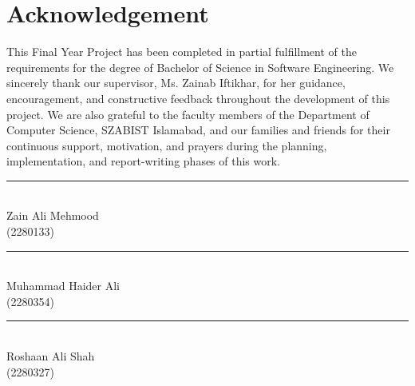 \newpage
\thispagestyle{empty}

\chapter*{\centering Acknowledgement}
\par\bigskip
This Final Year Project has been completed in partial fulfillment of the requirements for the degree of Bachelor of Science in Software Engineering. We sincerely thank our supervisor, Ms. Zainab Iftikhar, for her guidance, encouragement, and constructive feedback throughout the development of this project. We are also grateful to the faculty members of the Department of Computer Science, SZABIST Islamabad, and our families and friends for their continuous support, motivation, and prayers during the planning, implementation, and report-writing phases of this work.

\vspace{2cm}

\noindent
\begin{minipage}{0.45\textwidth}
\rule{6cm}{0.4pt}\\[4pt]
Zain Ali Mehmood\\
(2280133)
\end{minipage}
\hfill
\begin{minipage}{0.45\textwidth}
\rule{6cm}{0.4pt}\\[4pt]
Muhammad Haider Ali\\
(2280354)
\end{minipage}

\vspace{1.8cm}

\noindent
\begin{minipage}{0.45\textwidth}
\rule{6cm}{0.4pt}\\[4pt]
Roshaan Ali Shah\\
(2280327)
\end{minipage}
